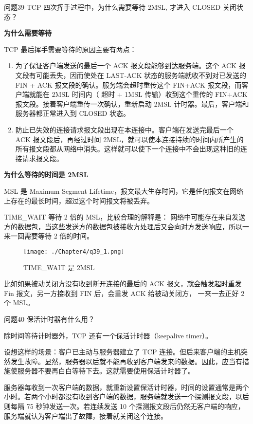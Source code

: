 \documentclass[cn,11pt,color=blue,lang=cn]{elegantbook}
\begin{document}
\begin{custom}{问题39}
TCP 四次挥手过程中，为什么需要等待 2MSL, 才进入 CLOSED 关闭状态？
\end{custom}
\begin{solution}
\begin{note} \textbf{为什么需要等待} \end{note}

TCP 最后挥手需要等待的原因主要有两点：
\begin{enumerate}
	\item 为了保证客户端发送的最后一个 ACK 报文段能够到达服务端。这个 ACK 报文段有可能丢失，因而使处在 LAST-ACK 状态的服务端就收不到对已发送的 FIN + ACK 报文段的确认。服务端会超时重传这个 FIN+ACK 报文段，而客户端就能在 2MSL 时间内（ 超时 + 1MSL 传输）收到这个重传的 FIN+ACK 报文段。接着客户端重传一次确认，重新启动 2MSL 计时器。最后，客户端和服务器都正常进入到 CLOSED 状态。

	\item 防止已失效的连接请求报文段出现在本连接中。客户端在发送完最后一个 ACK 报文段后，再经过时间 2MSL，就可以使本连接持续的时间内所产生的所有报文段都从网络中消失。这样就可以使下一个连接中不会出现这种旧的连接请求报文段。
\end{enumerate}
\begin{note} \textbf{为什么等待的时间是 2MSL} \end{note}

MSL 是 Maximum Segment Lifetime，报文最大生存时间，它是任何报文在网络上存在的最长时间，超过这个时间报文将被丢弃。

TIME\_WAIT 等待 2 倍的 MSL，比较合理的解释是： 网络中可能存在来自发送方的数据包，当这些发送方的数据包被接收方处理后又会向对方发送响应，所以一来一回需要等待 2 倍的时间。
\begin{figure}[htbp]
\centering
\texttt{[image: ./Chapter4/q39\_1.png]}
\caption{TIME\_WAIT 是 2MSL}
\label{fig39_1}
\end{figure}

比如如果被动关闭方没有收到断开连接的最后的 ACK 报文，就会触发超时重发 Fin 报文，另一方接收到 FIN 后，会重发 ACK 给被动关闭方， 一来一去正好 2 个 MSL。
\end{solution}


\begin{custom}{问题40}
保活计时器有什么用？
\end{custom}
\begin{solution}
除时间等待计时器外，TCP 还有一个保活计时器（keepalive timer）。

设想这样的场景：客户已主动与服务器建立了 TCP 连接。但后来客户端的主机突然发生故障。显然，服务器以后就不能再收到客户端发来的数据。因此，应当有措施使服务器不要再白白等待下去。这就需要使用保活计时器了。

服务器每收到一次客户端的数据，就重新设置保活计时器，时间的设置通常是两个小时。若两个小时都没有收到客户端的数据，服务端就发送一个探测报文段，以后则每隔 75 秒钟发送一次。若连续发送 10 个探测报文段后仍然无客户端的响应，服务端就认为客户端出了故障，接着就关闭这个连接。
\end{solution}
\end{document}
